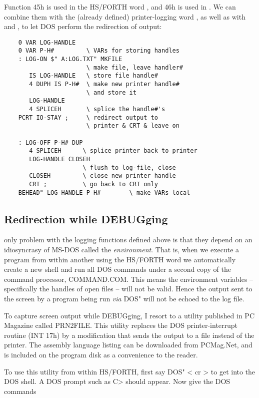 Function 45h is used in the HS/FORTH word , and 46h is used in . We can combine them with the (already defined) printer-logging word , as well as with  and , to let DOS perform the redirection of output:

\begin{lstlisting}
    0 VAR LOG-HANDLE
    0 VAR P-H#         \ VARs for storing handles
    : LOG-ON $" A:LOG.TXT" MKFILE
                       \ make file, leave handler#
       IS LOG-HANDLE   \ store file handle#
       4 DUPH IS P-H#  \ make new printer handle#
                       \ and store it
       LOG-HANDLE
       4 SPLICEH       \ splice the handle#'s
    PCRT IO-STAY ;     \ redirect output to
                       \ printer & CRT & leave on

    : LOG-OFF P-H# DUP
       4 SPLICEH      \ splice printer back to printer
       LOG-HANDLE CLOSEH
                      \ flush to log-file, close
       CLOSEH         \ close new printer handle
       CRT ;          \ go back to CRT only
    BEHEAD" LOG-HANDLE P-H#        \ make VARs local
\end{lstlisting}

\subsection{Redirection while DEBUGging}

 only problem with the logging functions defined above is that they depend on an idiosyncrasy of MS-DOS called the \textit{environment}. That is, when we execute a program from within another using the HS/FORTH word  we automatically create a new shell and run all DOS commands under a second copy of the command processor, COMMAND.COM. This means the environment variables -- specifically the handles of open files -- will not be valid. Hence the output sent to the screen by a program being run \textit{via} DOS" will not be echoed to the log file.

To capture screen output while DEBUGging, I resort to a utility published in PC Magazine called PRN2FILE. This utility replaces the DOS printer-interrupt routine (INT 17h) by a modification that sends the output to a file instead of the printer. The assembly language listing can be downloaded from PCMag.Net, and is included on the program disk as a convenience to the reader.

To use this utility from within HS/FORTH, first say DOS" < cr > to get into the DOS shell. A DOS prompt such as C> should appear.
Now give the DOS commands

